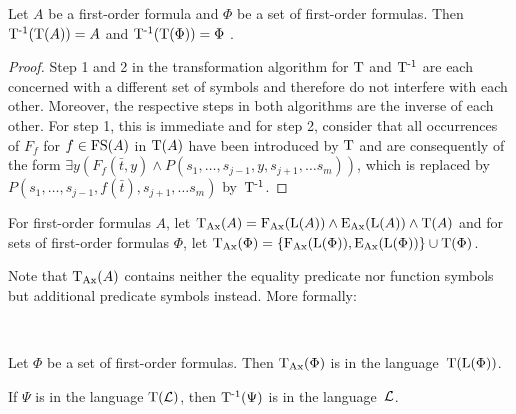 \begin{lemma}
	\label{lemma:tinv}
	Let $A$ be a first-order formula and $\Phi$ be a set of first-order formulas.
	Then 
	$\operatorname{T^{-1}}(\operatorname{T}(A)) = A$
	and
	$\operatorname{T^{-1}}(\operatorname{T}(\Phi)) = \Phi$
	.
\end{lemma}
\begin{proof}
	Step 1 and 2 in the transformation algorithm for $\operatorname{T}$ and $\operatorname{T^{-1}}$ are each concerned with a different set of symbols and therefore do not interfere with each other.
	Moreover, the respective steps in both algorithms are the inverse of each other.
	For step 1, this is immediate and for step 2, consider that all occurrences of $F_f$ for $f \in \operatorname{FS}(A)$ in $\operatorname{T}(A)$ have been introduced by $\operatorname{T}$ and are consequently of the form
	$\exists y (F_f(\bar t, y) \land P(s_1, \ldots, s_{j-1}, y, s_{j+1}, \ldots s_m))$, which is replaced by 
$P(s_1, \ldots, s_{j-1},\allowbreak f(\bar t),\allowbreak s_{j+1}, \ldots s_m)$ by~$\operatorname{T^{-1}}$.
\end{proof}

\begin{defi}
	For first-order formulas $A$, let $\operatorname{\operatorname{T}_{Ax}}(A) = \operatorname{F_{Ax}}(\operatorname{L}(A)) \land \operatorname{E_{Ax}}(\operatorname{L}(A)) \land \operatorname{T}(A)$ and for sets of first-order formulas $\Phi$, let $\operatorname{\operatorname{T}_{Ax}}(\Phi) = \{\operatorname{F_{Ax}}(\operatorname{L}(\Phi)), \operatorname{E_{Ax}}(\operatorname{L}(\Phi))\} \cup \operatorname{T}(\Phi)$.
\end{defi}


Note that $\operatorname{\operatorname{T}_{Ax}}(A)$ contains neither the equality predicate nor function symbols but additional predicate symbols instead. More formally:



\begin{lemma}~ 
	\label{lemma:trans_lang}
	\begin{compactenum}
	\item
		Let $\Phi$ be a set of first-order formulas. Then $\operatorname{\operatorname{T}_{Ax}}(\Phi)$ is in the language~$\operatorname{T}(\operatorname{L}(\Phi))$.
		\label{lemma:trans_lang1}

	\item 
		If $\Psi$ is in the language $\operatorname{T}(\operatorname{\mathcal{L}})$, then $\operatorname{T^{-1}}(\Psi)$ is in the language~$\operatorname{\mathcal{L}}$.
		\label{lemma:trans_lang2}
	\end{compactenum}
\end{lemma}

